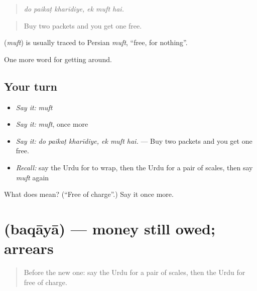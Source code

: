 \begin{quote}
\emph{do paikaṭ kharīdiye, ek muft hai.}
\end{quote}

\begin{quote}
Buy two packets and you get one free.
\end{quote}

\begin{cousinweb}
\textbf{} (\emph{muft}) is usually traced to Persian \emph{muft}, \textquotedblleft{}free, for nothing\textquotedblright{}.
\end{cousinweb}

\begin{grammarlens}[title={What you've built}]
One more word for getting around.
\end{grammarlens}

\subsection*{Your turn}
\begin{itemize}
\raggedright
  \item \emph{Say it:} \emph{muft}
  \item \emph{Say it:} \emph{muft}, once more
  \item \emph{Say it:} \emph{do paikaṭ kharīdiye, ek muft hai.} — Buy two packets and you get one free.
  \item \emph{Recall:} say the Urdu for to wrap, then the Urdu for a pair of scales, then say \emph{muft} again
\end{itemize}

\begin{tcolorbox}[breakable,colback=teal!4,colframe=teal!35!black,title={Before you move on}]
What does  mean? (\textquotedblleft{}Free of charge\textquotedblright{}.) Say it once more.
\end{tcolorbox}
\section[\texorpdfstring{\ur{بقایا} (baqāyā)}{بقایا (baqāyā)}]{ (baqāyā) — money still owed; arrears}

\label{lesson:UR-C425-baqaya}



\begin{quote}
Before the new one: say the Urdu for a pair of scales, then the Urdu for free of charge.
\end{quote}

